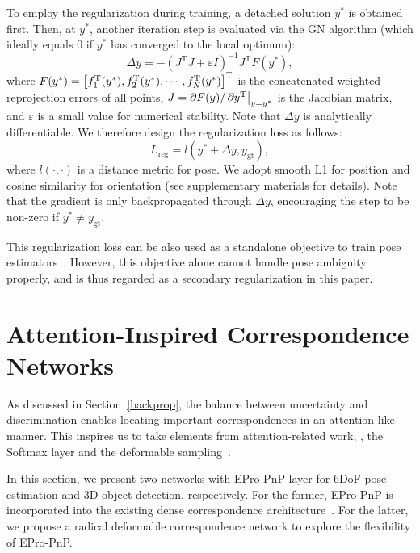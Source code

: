 \documentclass[10pt,twocolumn,letterpaper]{article}
\let\originalleft\left
\let\originalright\right
\renewcommand{\left}{\mathopen{}\mathclose\bgroup\originalleft}
\renewcommand{\right}{\aftergroup\egroup\originalright}
\let\originalpartial\partial
\renewcommand{\partial}{\mathop{}\!\mathrm{\originalpartial}}
\begin{document}
To employ the regularization during training, a detached solution $y^\ast$ is obtained first. Then, at $y^\ast$, another iteration step is evaluated via the GN algorithm (which ideally equals 0 if $y^\ast$ has converged to the local optimum):
\begin{equation}
    \Delta y = -(J^\text{T}J + \varepsilon I)^{-1} J^\text{T} F(y^\ast),
    \label{gnstep}
\end{equation}
where $F(y^\ast) = \left[f_1^\text{T}(y^\ast), f_2^\text{T}(y^\ast), \cdots, f_N^\text{T}(y^\ast)\right]^\text{T}$ is the concatenated weighted reprojection errors of all points, $J = \partial{F(y)} / \partial{y^\text{T}} \negthickspace \bigm|_{y=y^\ast}$ is the Jacobian matrix, 
and $\varepsilon$ is a small value for numerical stability. Note that $\Delta y$ is analytically differentiable. We therefore design the regularization loss as follows:
\begin{equation}
L_\text{reg} = l(y^\ast + \Delta y, y_\text{gt}),
\label{regloss}
\end{equation}
where $l(\cdot, \cdot)$ is a distance metric for pose. We adopt smooth L1 for position and cosine similarity for orientation (see supplementary materials for details). Note that the gradient is only backpropagated through $\Delta y$, encouraging the step to be non-zero if $y^\ast \neq y_\text{gt}$. 

This regularization loss can be also used as a standalone objective to train pose estimators~\cite{repose}. However, this objective alone cannot handle pose ambiguity properly, and is thus regarded as a secondary regularization in this paper.

\section{Attention-Inspired Correspondence Networks}

As discussed in Section~\ref{backprop}, the balance between uncertainty and discrimination enables locating important correspondences in an attention-like manner.
This inspires us to take elements from attention-related work, \ie, the Softmax layer and the deformable sampling~\cite{deformabledetr}.

In this section, we present two networks with EPro-PnP layer for 6DoF pose estimation and 3D object detection, respectively. For the former, EPro-PnP is incorporated into the existing dense correspondence architecture~\cite{CDPN}. For the latter, we propose a radical deformable correspondence network to explore the flexibility of EPro-PnP.
\end{document}
